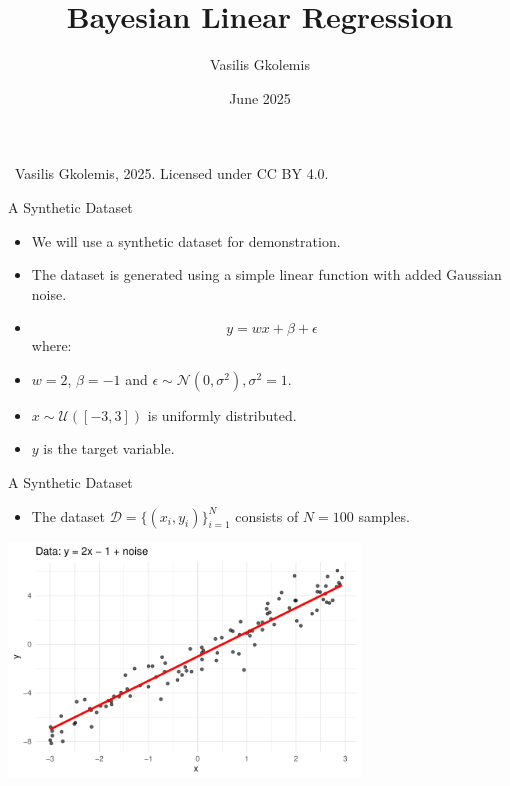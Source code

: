 \documentclass{beamer}
\title{Bayesian Linear Regression}
\author{Vasilis Gkolemis}
\institute{ATHENA RC | HUA}
\date{June 2025}
\begin{document}

\begin{frame}
  \titlepage
  \vfill
  \footnotesize
  \textcopyright\
  Vasilis Gkolemis, 2025. Licensed under CC BY 4.0.
\end{frame}

\begin{frame}{A Synthetic Dataset}
  \begin{itemize}
  \item We will use a synthetic dataset for demonstration.
  \item The dataset is generated using a simple linear function with added Gaussian noise.
  \end{itemize}
  \begin{itemize}
  \item[] \[y = wx + \beta + \epsilon\]
    where:
  \item[] $w = 2$, $\beta = -1$ and $\epsilon \sim \mathcal{N}(0, \sigma^2), \sigma^2 = 1$.
  \item[] $x \sim \mathcal{U}([-3, 3])$ is uniformly distributed.
  \item[] $y$ is the target variable.
    \end{itemize}
  \end{frame}

\begin{frame}{A Synthetic Dataset}
  \begin{itemize}
  \item The dataset $\mathcal{D} = \{(x_i, y_i)\}_{i=1}^{N}$ consists of $N = 100$ samples.
  \end{itemize}
  \begin{center}
    \includegraphics[width=0.7\textwidth]{data_plot.pdf}
  \end{center}
  \end{frame}
\end{document}
